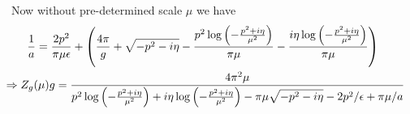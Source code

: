\documentclass{article}
\begin{document}
Now without pre-determined scale $\mu$ we have
\begin{align}
    \frac{1}{a} & =\frac{2 p^2}{\pi  \mu  \epsilon }+\left(\frac{4 \pi }{g}+\sqrt{-p^2-i \eta }-\frac{p^2 \log \left(-\frac{p^2+i \eta }{\mu ^2}\right)}{\pi  \mu }-\frac{i \eta  \log \left(-\frac{p^2+i \eta }{\mu ^2}\right)}{\pi  \mu }\right)                       \\
                & \hspace{-0.4in}\Rightarrow Z_g(\mu)g=\frac{4 \pi ^2 \mu  }{p^2 \log \left(-\frac{p^2+i \eta }{\mu ^2}\right)+i \eta  \log \left(-\frac{p^2+i \eta }{\mu ^2}\right)-\pi \mu  \sqrt{-p^2-i \eta }-2 p^2/\epsilon+\pi  \mu  /a}
\end{align}

\appendix




\end{document}
